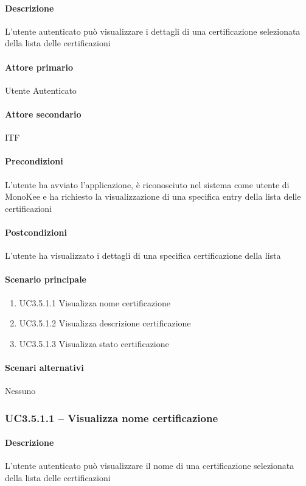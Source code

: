 \paragraph{Descrizione}  L’utente autenticato può visualizzare i dettagli di una certificazione selezionata della lista delle certificazioni
\paragraph{Attore primario}  Utente Autenticato
\paragraph{Attore secondario}  ITF
\paragraph{Precondizioni}  L’utente ha avviato l’applicazione, è riconosciuto nel sistema come utente di MonoKee e ha richiesto la visualizzazione di una specifica entry della lista delle certificazioni
\paragraph{Postcondizioni}  L’utente ha visualizzato i dettagli di una specifica certificazione della lista
\paragraph{Scenario principale}  
    \begin{enumerate}
        \item UC3.5.1.1 Visualizza nome certificazione
        \item UC3.5.1.2 Visualizza descrizione certificazione
        \item UC3.5.1.3 Visualizza stato certificazione
    \end{enumerate}
\paragraph{Scenari alternativi}  Nessuno




\subsubsection{UC3.5.1.1 – Visualizza nome certificazione}
\paragraph{Descrizione}  L’utente autenticato può visualizzare il nome di una certificazione selezionata della lista delle certificazioni
